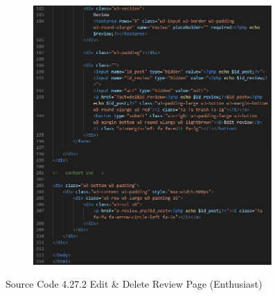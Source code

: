\begin{enumerate}[1.]
\begin{figure}[h]
\begin{subfigure}[b]{0.7\textwidth}
            \includegraphics[width=\textwidth]{mainmatter/images/frontend/code/eeditereview3.png}
            \label{fig:sub3}
        \end{subfigure}
        \caption*{Source Code 4.27.2 Edit \& Delete Review Page (Enthusiast)}
        \label{fig:myfig66b}
    \end{figure}


\end{enumerate}
